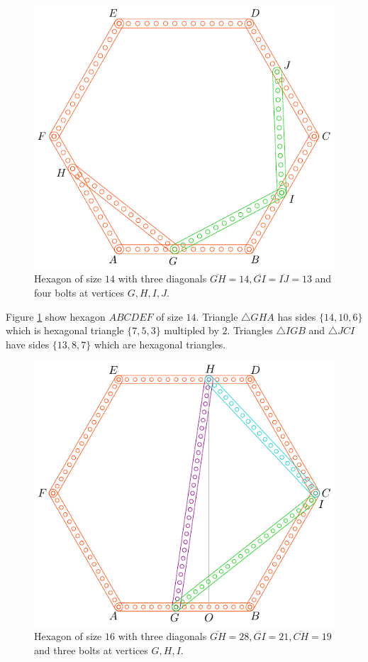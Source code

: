\documentclass[11pt]{article}
\begin{document}
\begin{figure}[H]
\centering
\includegraphics[scale=1]{14/hexa-14a}
\caption{Hexagon of size $14$ with three diagonals $\overline{GH} = 14, \overline{GI} = \overline{IJ} = 13$ and four bolts at vertices $G,H,I,J$.}
\label{fig:14a}
\end{figure}

Figure \ref{fig:14a} show hexagon $ABCDEF$ of size $14$. Triangle $\triangle{GHA}$ has sides $\{14,10,6\}$ which is hexagonal triangle $\{7,5,3\}$ multipled by $2$. Triangles $\triangle{IGB}$ and $\triangle{JCI}$ have sides $\{13,8,7\}$ which are hexagonal triangles.


\begin{figure}[H]
\centering
\includegraphics[scale=1]{16/hexa-16a}
\caption{Hexagon of size $16$ with three diagonals $\overline{GH} = 28, \overline{GI} = 21, \overline{CH} = 19$ and three bolts at vertices $G,H,I$.}
\label{fig:16a}
\end{figure}
\end{document}
